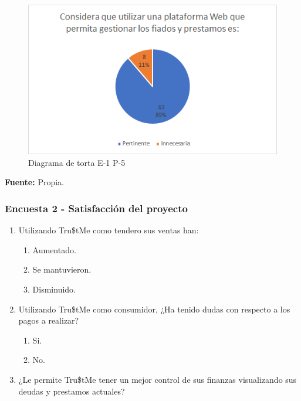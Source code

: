 {{		\begin{figure}[H]
			\centering
			\includegraphics[width=0.8\linewidth]{annexes/e1-p5.png}
			\caption{Diagrama de torta E-1 P-5}
		\end{figure}
		\begin{center}
			\textbf{Fuente:} Propia.
		\end{center}
		}
		
		\subsubsection*{Encuesta 2 - Satisfacción del proyecto}
		
			\begin{enumerate}
				
				\item Utilizando Tru\$tMe como tendero sus ventas han:
				
				\begin{enumerate}
					\item Aumentado.
					\item Se mantuvieron.
					\item Disminuido.
				\end{enumerate}
				
				\item Utilizando Tru\$tMe como consumidor, ¿Ha tenido dudas con respecto a los pagos a realizar?
				
				\begin{enumerate}
					\item Si.
					\item No.
				\end{enumerate}	
				
				\item ¿Le permite Tru\$tMe tener un mejor control de sus finanzas visualizando sus deudas y prestamos actuales?
				

\end{enumerate}}
